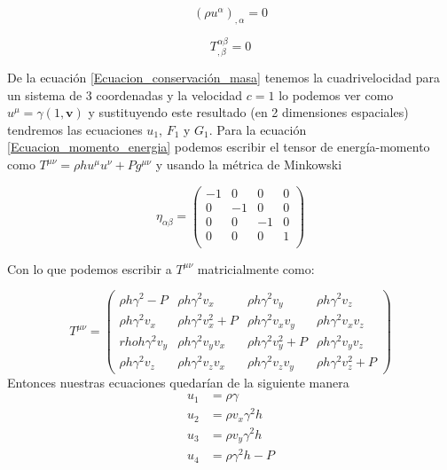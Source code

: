 \documentclass[12pt,a4paper]{book}
\begin{document}
\begin{equation}\label{Ecuacion_conservación_masa}
\left( \rho u^{\alpha} \right)_{, \alpha} =0
\end{equation}

\begin{equation}\label{Ecuacion_momento_energia}
T_{, \beta}^{\alpha \beta}=0
\end{equation}

De la ecuación \ref{Ecuacion_conservación_masa} tenemos la cuadrivelocidad para un sistema de 3 coordenadas y la velocidad $c=1$ lo podemos ver como $u^{\mu}=\gamma \left( 1, \textbf{v}\right)$ y sustituyendo este resultado (en 2 dimensiones espaciales) tendremos las ecuaciones $u_1$, $F_1$ y $G_1$. Para la ecuación \ref{Ecuacion_momento_energia} podemos escribir el tensor de energía-momento como $T^{\mu \nu} = \rho h u^{\mu} u^{\nu} + Pg^{\mu \nu}$ y usando la métrica de Minkowski

\begin{equation}
\eta_{\alpha \beta}= 
\begin{pmatrix}
 -1 & 0 & 0 & 0 \\
 0 & -1 & 0 & 0 \\
 0 & 0 & -1 & 0 \\
 0 & 0 & 0 & 1 \\
\end{pmatrix}
\end{equation}

Con lo que podemos escribir a $T^{\mu \nu}$ matricialmente como:

\begin{equation}
T^{\mu \nu} =
\begin{pmatrix}
\rho h \gamma^2-P & \rho h \gamma^2 v_{x}  & \rho h \gamma^2 v_{y} & \rho h \gamma^2 v_{z} \\

\rho h \gamma^2 v_{x} & \rho h \gamma^2 v_{x}^{2}+P & \rho h \gamma^2 v_{x}v_{y} &  \rho h \gamma^2 v_{x}v_{z} \\

rho h \gamma^2 v_{y} & \rho h \gamma^2 v_{y}v_{x} & \rho h \gamma^2 v_{y}^{2}+P & \rho h \gamma^2 v_{y}v_{z}\\

\rho h \gamma^2 v_{z} & \rho h \gamma^2 v_{z}v_{x} & \rho h \gamma^2 v_{z}v_{y} & \rho h \gamma^2 v_{z}^2 + P

\end{pmatrix}
\end{equation}
Entonces nuestras ecuaciones quedarían de la siguiente manera
\begin{align}
u_{1}& = \rho \gamma \\ 
u_{2}& = \rho v_{x} \gamma^{2} h \\ 
u_{3}& = \rho v_{y} \gamma^{2} h \\ 
u_{4}& = \rho \gamma^{2} h - P 
\end{align}
\end{document}
